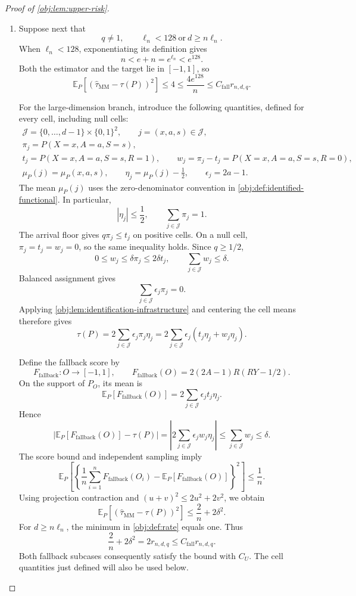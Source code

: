 \begin{proof}[Proof of \cref{obj:lem:upper-risk}]
\begin{enumerate}
\item Suppose next that
\[
q\ne1,
\qquad
\ell_n<128\ \text{or}\ d\ge n\ell_n.
\]
When \(\ell_n<128\), exponentiating its definition gives
\[
n<e+n=e^{\ell_n}<e^{128}.
\]
Both the estimator and the target lie in \([-1,1]\), so
\[
\mathbb E_P[(\widehat\tau_{\mathrm{MM}}-\tau(P))^2]
\le4
\le\frac{4e^{128}}n
\le C_{\mathrm{fall}}r_{n,d,q}.
\]

For the large-dimension branch, introduce the following quantities, defined for every cell, including null cells:
\[
\begin{gathered}
\mathcal J=\{0,\ldots,d-1\}\times\{0,1\}^2,
\qquad j=(x,a,s)\in\mathcal J,\\
\pi_j=P(X=x,A=a,S=s),\\
t_j=P(X=x,A=a,S=s,R=1),
\qquad
w_j=\pi_j-t_j=P(X=x,A=a,S=s,R=0),\\
\mu_P(j)=\mu_P(x,a,s),
\qquad
\eta_j=\mu_P(j)-\frac12,
\qquad
\epsilon_j=2a-1.
\end{gathered}
\]
The mean \(\mu_P(j)\) uses the zero-denominator convention in
\cref{obj:def:identified-functional}. In particular,
\[
|\eta_j|\le\frac12,\qquad
\sum_{j\in\mathcal J}\pi_j=1.
\]
The arrival floor gives \(q\pi_j\le t_j\) on positive cells. On a null cell,
\(\pi_j=t_j=w_j=0\), so the same inequality holds. Since \(q\ge1/2\),
\[
0\le w_j\le\delta\pi_j\le2\delta t_j,
\qquad
\sum_{j\in\mathcal J}w_j\le\delta.
\]
Balanced assignment gives
\[
\sum_{j\in\mathcal J}\epsilon_j\pi_j=0.
\]
Applying \cref{obj:lem:identification-infrastructure} and centering the cell means therefore gives
\[
\tau(P)
=2\sum_{j\in\mathcal J}\epsilon_j\pi_j\eta_j
=2\sum_{j\in\mathcal J}\epsilon_j(t_j\eta_j+w_j\eta_j).
\]

Define the fallback score by
\[
F_{\mathrm{fallback}}:O\longrightarrow[-1,1],
\qquad
F_{\mathrm{fallback}}(O)=2(2A-1)R(RY-1/2).
\]
On the support of \(P_O\), its mean is
\[
\mathbb E_P[F_{\mathrm{fallback}}(O)]
=2\sum_{j\in\mathcal J}\epsilon_jt_j\eta_j.
\]
Hence
\[
\left|\mathbb E_P[F_{\mathrm{fallback}}(O)]-\tau(P)\right|
=\left|2\sum_{j\in\mathcal J}\epsilon_jw_j\eta_j\right|
\le\sum_{j\in\mathcal J}w_j
\le\delta.
\]
The score bound and independent sampling imply
\[
\mathbb E_P\!\left[
\left\{\frac1n\sum_{i=1}^nF_{\mathrm{fallback}}(O_i)
-\mathbb E_P[F_{\mathrm{fallback}}(O)]\right\}^2
\right]\le\frac1n.
\]
Using projection contraction and
\((u+v)^2\le2u^2+2v^2\), we obtain
\[
\mathbb E_P[(\widehat\tau_{\mathrm{MM}}-\tau(P))^2]
\le\frac2n+2\delta^2.
\]
For \(d\ge n\ell_n\), the minimum in \cref{obj:def:rate} equals one. Thus
\[
\frac2n+2\delta^2
=2r_{n,d,q}
\le C_{\mathrm{fall}}r_{n,d,q}.
\]
Both fallback subcases consequently satisfy the bound with \(C_U\).
The cell quantities just defined will also be used below.


\end{enumerate}
\end{proof}
